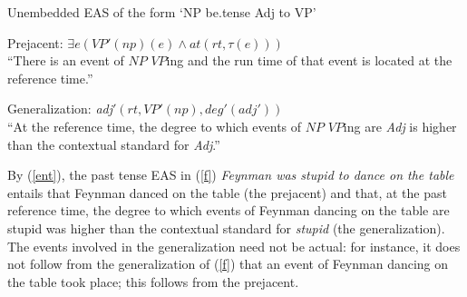\documentclass[11pt,fleqn]{article}
\newcommand{\6}{\mbox{$[\hspace*{-.6mm}[$}}
\newcommand{\9}{\mbox{$]\hspace*{-.6mm}]$}}
\begin{document}
\begin{exe}
\ex\label{ent}  Unembedded EAS of the form `NP be{\sc .tense} Adj to VP'

\begin{xlist}

\ex Prejacent: $\exists e (VP'(np)(e) \wedge at(rt,\tau(e)))$ \\ ``There is an event of $NP$ $VP$ing and the run time of that event is  located at the reference time.''

\ex Generalization: {\em adj}$'(rt,VP'(np),deg'(adj'))$ \\ ``At the reference time, the degree to which events of $NP$ $VP$ing are {\em Adj} is higher than the contextual standard for {\em Adj}.''


\end{xlist}

%
%
%
%
%
%
%
%
%
%
\end{exe}
By (\ref{ent}), the past tense EAS in (\ref{f}) {\em Feynman was stupid to dance on the table} entails that Feynman danced on the table (the prejacent) and that, at the past reference time, the degree to which events of Feynman dancing on the table are stupid was higher than the contextual standard for {\em stupid} (the generalization). The events involved in the generalization need not be actual: for instance, it does not follow from the generalization of (\ref{f}) that an event of Feynman dancing on the table took place; this follows from the prejacent.
\end{document}
